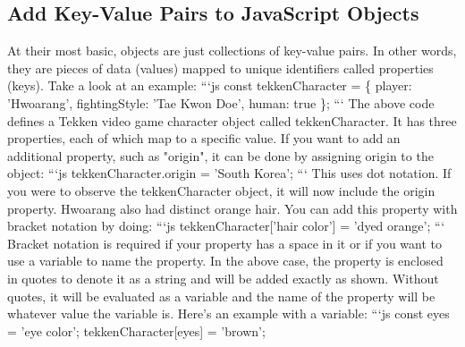 \documentclass{article}%
\begin{document}
\subsection{Add Key{-}Value Pairs to JavaScript Objects}%
\label{subsec:AddKey{-}ValuePairstoJavaScriptObjects}%
At their most basic, objects are just collections of key{-}value pairs. In other words, they are pieces of data (values) mapped to unique identifiers called properties (keys). Take a look at an example:\newline%
```js\newline%
const tekkenCharacter = \{\newline%
  player: 'Hwoarang',\newline%
  fightingStyle: 'Tae Kwon Doe',\newline%
  human: true\newline%
\};\newline%
```\newline%
The above code defines a Tekken video game character object called tekkenCharacter. It has three properties, each of which map to a specific value. If you want to add an additional property, such as "origin", it can be done by assigning origin to the object:\newline%
```js\newline%
tekkenCharacter.origin = 'South Korea';\newline%
```\newline%
This uses dot notation. If you were to observe the tekkenCharacter object, it will now include the origin property. Hwoarang also had distinct orange hair. You can add this property with bracket notation by doing:\newline%
```js\newline%
tekkenCharacter{[}'hair color'{]} = 'dyed orange';\newline%
```\newline%
Bracket notation is required if your property has a space in it or if you want to use a variable to name the property. In the above case, the property is enclosed in quotes to denote it as a string and will be added exactly as shown. Without quotes, it will be evaluated as a variable and the name of the property will be whatever value the variable is. Here's an example with a variable:\newline%
```js\newline%
const eyes = 'eye color';\newline%
tekkenCharacter{[}eyes{]} = 'brown';\newline%
\end{document}
